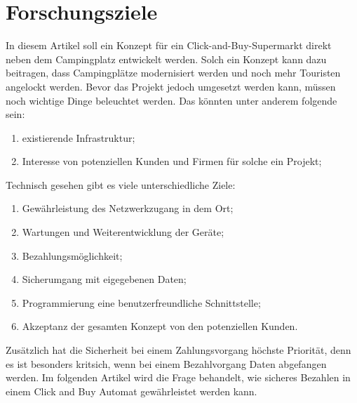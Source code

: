 \section{Forschungsziele}


In diesem Artikel soll ein Konzept für ein Click-and-Buy-Supermarkt direkt neben dem Campingplatz 
entwickelt werden. Solch ein Konzept kann dazu beitragen, dass Campingplätze modernisiert werden 
und noch mehr Touristen angelockt werden. Bevor das Projekt jedoch umgesetzt werden kann, müssen 
noch wichtige Dinge beleuchtet werden. Das könnten unter anderem folgende sein:

\begin{enumerate}
    \item existierende Infrastruktur;
    \item Interesse von potenziellen Kunden und Firmen für solche ein Projekt;
\end{enumerate}


Technisch gesehen gibt es viele unterschiedliche Ziele:
\begin{enumerate}
    \item Gewährleistung des Netzwerkzugang in dem Ort;
    \item Wartungen und Weiterentwicklung der Geräte;
    \item Bezahlungsmöglichkeit;
    \item Sicherumgang mit eigegebenen Daten;
    \item Programmierung eine benutzerfreundliche Schnittstelle;
    \item Akzeptanz der gesamten Konzept von den potenziellen Kunden.
\end{enumerate}

Zusätzlich hat die Sicherheit bei einem Zahlungsvorgang höchste Priorität, denn es ist besonders kritsich, 
wenn bei einem Bezahlvorgang Daten abgefangen werden. Im folgenden Artikel wird die Frage behandelt, 
wie sicheres Bezahlen in einem Click and Buy Automat gewährleistet werden kann.

%
%
%
%

%
%
%
%
%